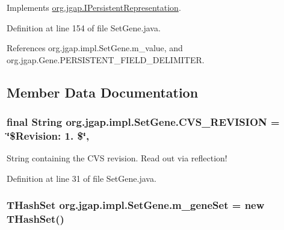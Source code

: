 Implements \hyperlink{interfaceorg_1_1jgap_1_1_i_persistent_representation_a94a345f1919c4840dd0b9eecf7afc6a3}{org.\-jgap.\-I\-Persistent\-Representation}.



Definition at line 154 of file Set\-Gene.\-java.



References org.\-jgap.\-impl.\-Set\-Gene.\-m\-\_\-value, and org.\-jgap.\-Gene.\-P\-E\-R\-S\-I\-S\-T\-E\-N\-T\-\_\-\-F\-I\-E\-L\-D\-\_\-\-D\-E\-L\-I\-M\-I\-T\-E\-R.



\subsection{Member Data Documentation}
\hypertarget{classorg_1_1jgap_1_1impl_1_1_set_gene_a619546d3b881a562d1a7a5f803039ec8}{
\subsubsection[{C\-V\-S\-\_\-\-R\-E\-V\-I\-S\-I\-O\-N}]{\setlength{\rightskip}{0pt plus 5cm}final String org.\-jgap.\-impl.\-Set\-Gene.\-C\-V\-S\-\_\-\-R\-E\-V\-I\-S\-I\-O\-N = \char`\"{}\$Revision\-: 1. \$\char`\"{}\hspace{0.3cm}{\ttfamily [static]}, {\ttfamily [private]}}}\label{classorg_1_1jgap_1_1impl_1_1_set_gene_a619546d3b881a562d1a7a5f803039ec8}
String containing the C\-V\-S revision. Read out via reflection! 

Definition at line 31 of file Set\-Gene.\-java.

\hypertarget{classorg_1_1jgap_1_1impl_1_1_set_gene_ad23380d593a6a466d9f85780a120d85f}{
\subsubsection[{m\-\_\-gene\-Set}]{\setlength{\rightskip}{0pt plus 5cm}T\-Hash\-Set org.\-jgap.\-impl.\-Set\-Gene.\-m\-\_\-gene\-Set = new T\-Hash\-Set()\hspace{0.3cm}{\ttfamily [private]}}}\label{classorg_1_1jgap_1_1impl_1_1_set_gene_ad23380d593a6a466d9f85780a120d85f}


